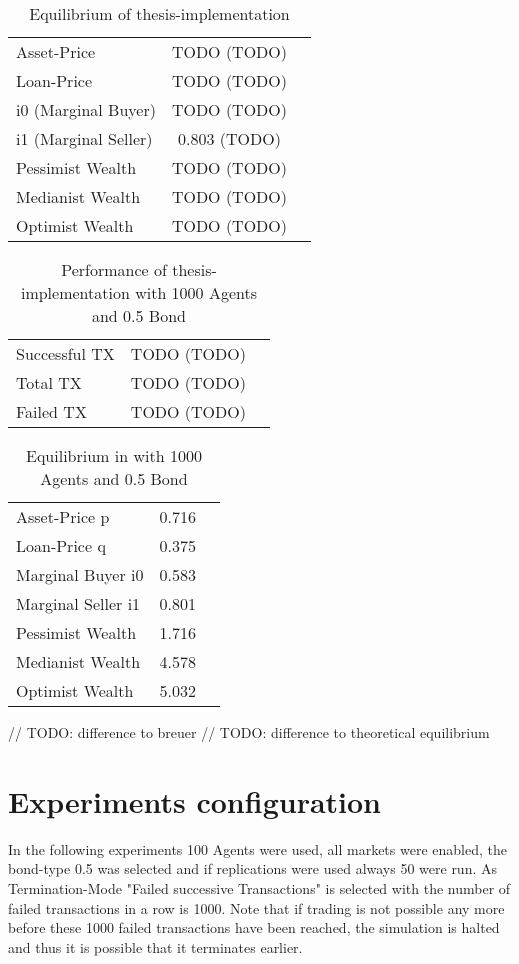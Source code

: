 \documentclass[Bachelorarbeit.tex]{subfiles}
\begin{document}
\begin{table}[h]
	\centering
	\caption{Equilibrium of thesis-implementation}
	\begin{tabular} { l c r }
		\hline
		Asset-Price & TODO (TODO) \\
		Loan-Price & TODO (TODO) \\
		i0 (Marginal Buyer) & TODO (TODO) \\
		i1 (Marginal Seller) & 0.803 (TODO) \\
		Pessimist Wealth & TODO (TODO) \\
		Medianist Wealth & TODO (TODO) \\
		Optimist Wealth & TODO (TODO) \\
		\hline
	\end{tabular}
\end{table}



\begin{table}[h]
	\centering
	\caption{Performance of thesis-implementation with 1000 Agents and 0.5 Bond}
	\begin{tabular} { l c r }
		\hline
		Successful TX & TODO (TODO) \\
		Total TX & TODO (TODO) \\
		Failed TX & TODO (TODO) \\
		\hline
	\end{tabular}
\end{table}

\begin{table}[h]
	\centering
	\caption{Equilibrium in \cite{Breuer2015} with 1000 Agents and 0.5 Bond }
	\begin{tabular} { l c r }
		\hline
		Asset-Price p & 0.716 \\
		Loan-Price q & 0.375 \\
		Marginal Buyer i0 & 0.583 \\
		Marginal Seller i1 & 0.801 \\
		Pessimist Wealth & 1.716 \\
		Medianist Wealth & 4.578 \\
		Optimist Wealth & 5.032 \\
		\hline
	\end{tabular}
\end{table}

// TODO: difference to breuer 
// TODO: difference to theoretical equilibrium

\section{Experiments configuration}
In the following experiments 100 Agents were used, all markets were enabled, the bond-type 0.5 was selected and if replications were used always 50 were run.
As Termination-Mode "Failed successive Transactions" is selected with the number of failed transactions in a row is 1000. Note that if trading is not possible any more before these 1000 failed transactions have been reached, the simulation is halted and thus it is possible that it terminates earlier.
\end{document}
